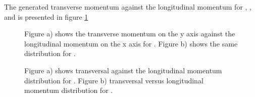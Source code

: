 The generated transverse momentum against the longitudinal momentum for \lam, \alam, \anticascade and \excitedcascade is 
presented in figure \ref{fig:MC_lambda0_pt_vs_pz}%


\begin{figure}
	\caption{Figure a) shows the transverse momentum on the y axis against the longitudinal momentum on the x axis for \lam. Figure b) 
			shows the same distribution for \alam.}
	\label{fig:MC_lambda0_pt_vs_pz}
\end{figure}


\begin{figure}
	\caption{Figure a) shows transversal against the longitudinal momentum distribution for \anticascade. Figure b) 
			transversal versus longitudinal momentum distribution for \excitedcascade.}
	\label{fig:MC_xi_pt_vs_pz}
\end{figure}

